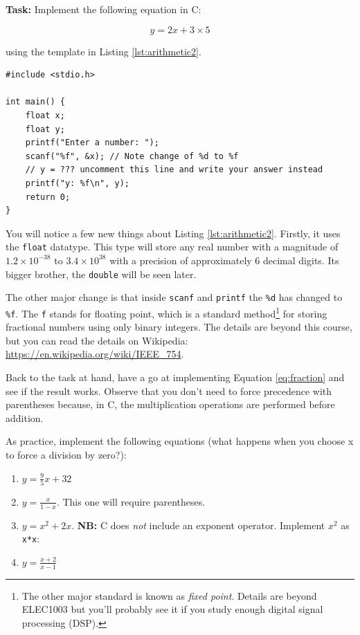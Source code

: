 \documentclass{lab}
\begin{document}
\textbf{Task:} Implement the following equation in C:

\begin{equation}\label{eq:fraction}
y = 2x+3\times5
\end{equation}

using the template in Listing \ref{lst:arithmetic2}.

\begin{lstlisting}[style=CStyle,caption=A basic arithmetic example,label=lst:arithmetic2]
#include <stdio.h>

int main() {
	float x;
	float y;
	printf("Enter a number: ");
	scanf("%f", &x); // Note change of %d to %f
	// y = ??? uncomment this line and write your answer instead
	printf("y: %f\n", y);
	return 0;
}
\end{lstlisting}

You will notice a few new things about Listing \ref{lst:arithmetic2}. Firstly, it uses the \texttt{float} datatype. This type will store any real number with a magnitude of $1.2 \times 10^{-38}$ to $3.4 \times 10^{38}$ with a precision of approximately 6 decimal digits. Its bigger brother, the \texttt{double} will be seen later.

The other major change is that inside \texttt{scanf} and \texttt{printf} the \texttt{\%d} has changed to \texttt{\%f}. The \texttt{f} stands for floating point, which is a standard method\footnote{The other major standard is known as \textit{fixed point}. Details are beyond ELEC1003 but you'll probably see it if you study enough digital signal processing (DSP).} for storing fractional numbers using only binary integers. The details are beyond this course, but you can read the details on Wikipedia: \url{https://en.wikipedia.org/wiki/IEEE_754}.

Back to the task at hand, have a go at implementing Equation \ref{eq:fraction} and see if the result works. Observe that you don't need to force precedence with parentheses because, in C, the multiplication operations are performed before addition.

As practice, implement the following equations (what happens when you choose x to force a division by zero?):


\begin{enumerate}
\item $y = \frac{9}{5} x + 32$
\item $y = \frac{x}{1 - x}$.  This one will require parentheses.
\item $y = x^2 + 2x$. \textbf{NB:} C does \textit{not} include an exponent operator. Implement $x^2$ as \texttt{x*x}:
\item $y = \frac{x + 2}{x - 1}$
\end{enumerate}
\end{document}
